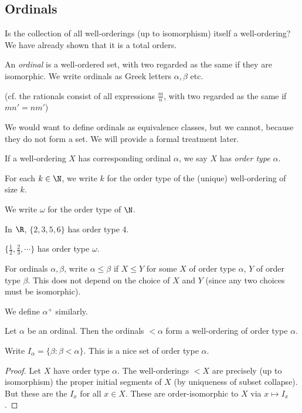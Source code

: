 \documentclass[a4paper]{article}
\begin{document}
\subsection{Ordinals}
Is the collection of all well-orderings (up to isomorphism) itself a well-ordering? We have already shown that it is a total orders.

\begin{defi}[Ordinal]
  An \emph{ordinal} is a well-ordered set, with two regarded as the same if they are isomorphic. We write ordinals as Greek letters $\alpha, \beta$ etc.

  (cf. the rationals consist of all expressions $\frac{m}{n}$, with two regarded as the same if $mn' = nm'$)
\end{defi}
We would want to define ordinals as equivalence classes, but we cannot, because they do not form a set. We will provide a formal treatment later.

\begin{defi}
  If a well-ordering $X$ has corresponding ordinal $\alpha$, we say $X$ has \emph{order type} $\alpha$.
\end{defi}

\begin{notation}
  For each $k\in \N$, we write $k$ for the order type of the (unique) well-ordering of size $k$.

  We write $\omega$ for the order type of $\N$.
\end{notation}

\begin{eg}
  In $\R$, $\{2, 3, 5 ,6\}$ has order type 4.

  $\{\frac{1}{2}, \frac{2}{3}, \cdots\}$ has order type $\omega$.
\end{eg}

\begin{notation}
  For ordinals $\alpha, \beta$, write $\alpha \leq \beta$ if $X\leq Y$ for some $X$ of order type $\alpha$, $Y$ of order type $\beta$. This does not depend on the choice of $X$ and $Y$ (since any two choices must be isomorphic).

  We define $\alpha^+$ similarly.
\end{notation}

\begin{prop}
  Let $\alpha$ be an ordinal. Then the ordinals $<\alpha$ form a well-ordering of order type $\alpha$.
\end{prop}

\begin{notation}
  Write $I_\alpha = \{\beta: \beta < \alpha\}$. This is a nice set of order type $\alpha$.
\end{notation}

\begin{proof}
  Let $X$ have order type $\alpha$. The well-orderings $< X$ are precisely (up to isomorphism) the proper initial segments of $X$ (by uniqueness of subset collapse). But these are the $I_x$ for all $x\in X$. These are order-isomorphic to $X$ via $x\mapsto I_x$.
\end{proof}
\end{document}
